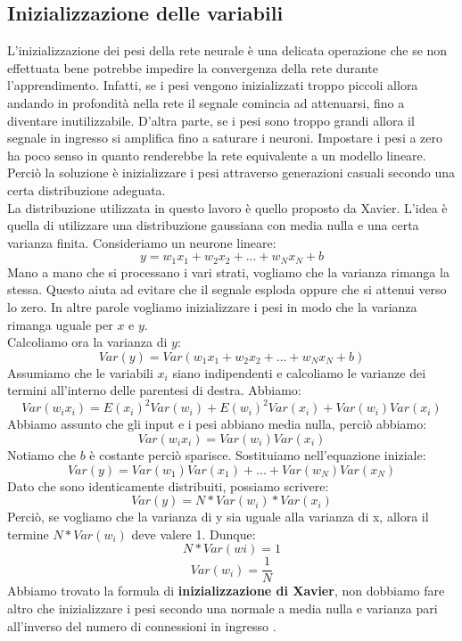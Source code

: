 \subsection{Inizializzazione delle variabili}
L'inizializzazione dei pesi della rete neurale è una delicata operazione che se non effettuata bene potrebbe impedire la convergenza della rete durante l'apprendimento. Infatti, se i pesi vengono inizializzati troppo piccoli allora andando in profondità nella rete il segnale comincia ad attenuarsi, fino a diventare inutilizzabile. D'altra parte, se i pesi sono troppo grandi allora il segnale in ingresso si amplifica fino a saturare i neuroni. Impostare i pesi a zero ha poco senso in quanto renderebbe la rete equivalente a un modello lineare. Perciò la soluzione è inizializzare i pesi attraverso generazioni casuali secondo una certa distribuzione adeguata.\\
La distribuzione utilizzata in questo lavoro è quello proposto da Xavier. L'idea è quella di utilizzare una distribuzione gaussiana con media nulla e una certa varianza finita. Consideriamo un neurone lineare:
$$y = w_1 x_1 + w_2 x_2 + ... + w_N x_N + b$$
Mano a mano che si processano i vari strati, vogliamo che la varianza rimanga la stessa. Questo aiuta ad evitare che il segnale esploda oppure che si attenui verso lo zero. In altre parole vogliamo inizializzare i pesi in modo che la varianza rimanga uguale per $x$ e $y$.\\
Calcoliamo ora la varianza di $y$:
$$Var(y) = Var(w_1x_1 + w_2x_2 + ... + w_Nx_N + b)$$
Assumiamo che le variabili $x_i$ siano indipendenti e calcoliamo le varianze dei termini all'interno delle parentesi di destra. Abbiamo:
$$Var(w_ix_i) = E(x_i)^2Var(w_i) + E(w_i)^2Var(x_i) + Var(w_i)Var(x_i)$$
Abbiamo assunto che gli input e i pesi abbiano media nulla, perciò abbiamo:
$$Var(w_ix_i) = Var(w_i)Var(x_i)$$
Notiamo che $b$ è costante perciò sparisce. Sostituiamo nell'equazione iniziale:
$$Var(y) = Var(w_1)Var(x_1) + ... + Var(w_N)Var(x_N)$$
Dato che sono identicamente distribuiti, possiamo scrivere:
$$Var(y) = N * Var(w_i) * Var(x_i)$$
Perciò, se vogliamo che la varianza di y sia uguale alla varianza di x, allora il termine $N*Var(w_i)$ deve valere 1. Dunque:
$$N * Var(wi) = 1$$
$$Var(w_i) = \frac{1}{N}$$
Abbiamo trovato la formula di \textbf{inizializzazione di Xavier}, non dobbiamo fare altro che inizializzare i pesi secondo una normale a media nulla e varianza pari all'inverso del numero di connessioni in ingresso \cite{xavier}.
